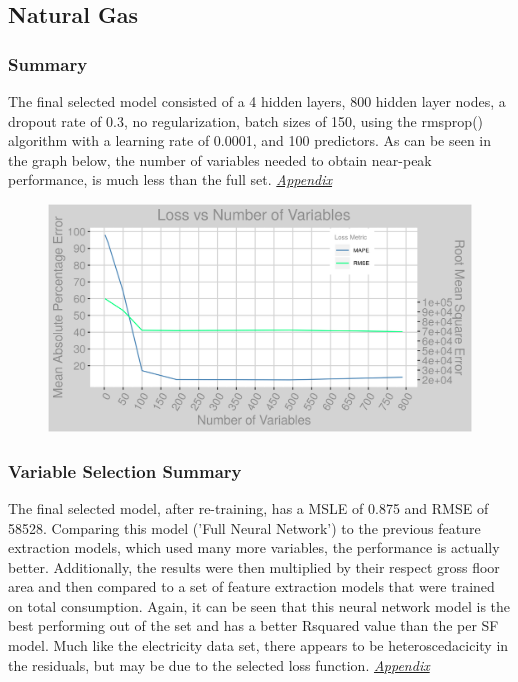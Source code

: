 \subsection{Natural Gas}
\subsubsection{Summary}
The final selected model consisted of a 4 hidden layers, 800 hidden layer nodes, a dropout rate of 0.3, no regularization, batch sizes of 150, using the rmsprop() algorithm with a learning rate of 0.0001, and 100 predictors.  As can be seen in the graph below, the number of variables needed to obtain near-peak performance, is much less than the full set. \textit{\hyperref[appendix_nn:natural_gas:nn_full]{Appendix}}

\begin{figure}[h]
\centering
\includegraphics[width=\textwidth, height=0.25\textheight]{Images/natural_gas_psf_nn_error.png}
\end{figure}

\subsubsection{Variable Selection Summary}
The final selected model, after re-training, has a MSLE of 0.875 and RMSE of 58528.  Comparing this model ('Full Neural Network') to the previous feature extraction models, which used many more variables, the performance is actually better.  Additionally, the results were then multiplied by their respect gross floor area and then compared to a set of feature extraction models that were trained on total consumption.  Again, it can be seen that this neural network model is the best performing out of the set and has a better Rsquared value than the per SF model.  Much like the electricity data set, there appears to be heteroscedacicity in the residuals, but may be due to the selected loss function.  \textit{\hyperref[appendix_nn:natural_gas:nn_full_variables]{Appendix}}

